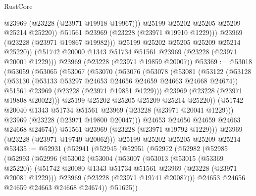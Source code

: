 \begin{lexlean}{RustCore}
\begin{coremodule}
                  @23969
                  (@23228 (@23971 @19918 @19967)))
                @25199
                @25202
                @25205
                @25209
                @25214
                @25220))
            @51561
            @23969
            (@23228 (@23971 @19910 @1229)))
          @23969
          (@23228 (@23971 @19867 @19982)))
        @25199
        @25202
        @25205
        @25209
        @25214
        @25220))
    (@51742 @20000 @1343 @51734 @51561 @23969 (@23228 (@23971 @20001 @1229)))
    @23969
    (@23228 (@23971 @19859 @20007))
@53369 := @53018
    (@53059
      (@53065
        (@53067
          (@53070
            (@53076
              (@53078
                (@53081
                  (@53122
                    (@53128
                      (@53130 (@53133 @53297 @24653 @24656 @24659 @24663 @24668 @24674))
                      @51561
                      @23969
                      (@23228 (@23971 @19851 @1229)))
                    @23969
                    (@23228 (@23971 @19808 @20022)))
                  @25199
                  @25202
                  @25205
                  @25209
                  @25214
                  @25220))
              (@51742 @20040 @1343 @51734 @51561 @23969 (@23228 (@23971 @20041 @1229)))
              @23969
              (@23228 (@23971 @19800 @20047)))
            @24653
            @24656
            @24659
            @24663
            @24668
            @24674))
        @51561
        @23969
        (@23228 (@23971 @19792 @1229)))
      @23969
      (@23228 (@23971 @19749 @20062)))
    @25199
    @25202
    @25205
    @25209
    @25214
@53435 := @52931
    (@52941
      (@52945
        (@52951
          (@52972
            (@52982
              (@52985
                (@52993
                  (@52996
                    (@53002
                      (@53004
                        (@53007
                          (@53013
                            (@53015 (@53369 @25220))
                            (@51742
                              @20080
                              @1343
                              @51734
                              @51561
                              @23969
                              (@23228 (@23971 @20081 @1229)))
                            @23969
                            (@23228 (@23971 @19741 @20087)))
                          @24653
                          @24656
                          @24659
                          @24663
                          @24668
                          @24674))
                      @51625))

\end{coremodule}
\end{lexlean}
